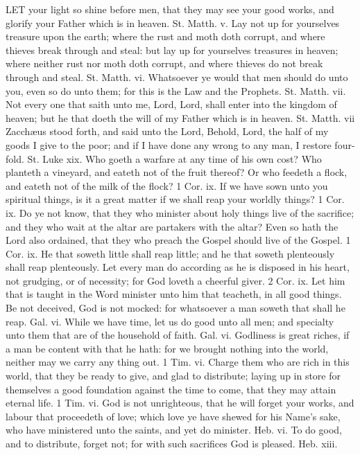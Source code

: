 LET your light so shine before men, that they may see your good works, and glorify your Father which is in heaven. St. Matth. v.
    Lay not up for yourselves treasure upon the earth; where the rust and moth doth corrupt, and where thieves break through and steal: but lay up for yourselves treasures in heaven; where neither rust nor moth doth corrupt, and where thieves do not break through and steal. St. Matth. vi.
    Whatsoever ye would that men should do unto you, even so do unto them; for this is the Law and the Prophets. St. Matth. vii.
    Not every one that saith unto me, Lord, Lord, shall enter into the kingdom of heaven; but he that doeth the will of my Father which is in heaven. St. Matth. vii
    Zacchæus stood forth, and said unto the Lord, Behold, Lord, the half of my goods I give to the poor; and if I have done any wrong to any man, I restore four-fold. St. Luke xix.
    Who goeth a warfare at any time of his own cost? Who planteth a vineyard, and eateth not of the fruit thereof? Or who feedeth a flock, and eateth not of the milk of the flock? 1 Cor. ix.
    If we have sown unto you spiritual things, is it a great matter if we shall reap your worldly things? 1 Cor. ix.
    Do ye not know, that they who minister about holy things live of the sacrifice; and they who wait at the altar are partakers with the altar? Even so hath the Lord also ordained, that they who preach the Gospel should live of the Gospel. 1 Cor. ix.
    He that soweth little shall reap little; and he that soweth plenteously shall reap plenteously. Let every man do according as he is disposed in his heart, not grudging, or of necessity; for God loveth a cheerful giver. 2 Cor. ix.
    Let him that is taught in the Word minister unto him that teacheth, in all good things. Be not deceived, God is not mocked: for whatsoever a man soweth that shall he reap. Gal. vi.
    While we have time, let us do good unto all men; and specialty unto them that are of the household of faith. Gal. vi.
    Godliness is great riches, if a man be content with that he hath: for we brought nothing into the world, neither may we carry any thing out. 1 Tim. vi.
    Charge them who are rich in this world, that they be ready to give, and glad to distribute; laying up in store for themselves a good foundation against the time to come, that they may attain eternal life. 1 Tim. vi.
    God is not unrighteous, that he will forget your works, and labour that proceedeth of love; which love ye have shewed for his Name's sake, who have ministered unto the saints, and yet do minister. Heb. vi.
    To do good, and to distribute, forget not; for with such sacrifices God is pleased. Heb. xiii.
